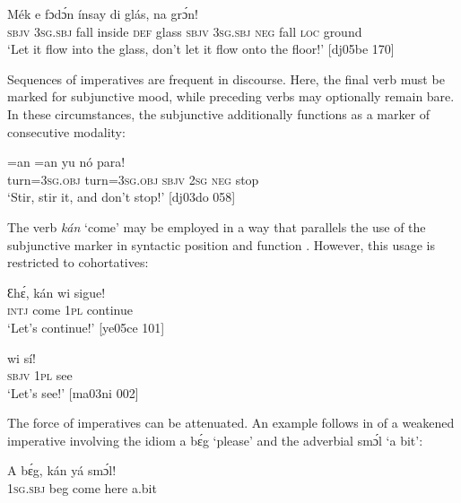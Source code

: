 \ea%
    \label{ex:key:435}
    \gll Mék    e    fɔdɔ́n  ínsay  di  glás,     
   na  grɔ́n!\\
\textsc{sbjv}    \textsc{3sg.sbj}  fall    inside  \textsc{def}  glass  \textsc{sbjv}    \textsc{3sg.sbj}
\textsc{neg}  fall    \textsc{loc}  ground\\

\glt ‘Let it flow into the glass, don’t let it flow onto the floor!’ [dj05be 170]
\z

Sequences of imperatives are frequent in discourse. Here, the final verb must be marked for subjunctive mood, while preceding verbs may optionally remain bare. In these circumstances, the subjunctive additionally functions as a marker of consecutive modality: 


\ea%
    \label{ex:key:436}
    \gll {}=an    =an     yu  nó  para!\\
turn=\textsc{3sg.obj}  turn=\textsc{3sg.obj}  \textsc{sbjv}    \textsc{2sg}  \textsc{neg}  stop\\

\glt ‘Stir, stir it, and don’t stop!’ [dj03do 058]
\z

The verb \textit{kán} ‘come’  may be employed in a way that parallels the use of the subjunctive marker in syntactic position and function . However, this usage is restricted to cohortatives:


\ea%
    \label{ex:key:437}
    \gll Ɛhɛ́,    kán    wi  sigue!\\
\textsc{intj}    come  \textsc{1pl}  continue\\

\glt ‘Let’s continue!’ [ye05ce 101] 
\z


\ea%
    \label{ex:key:438}
    \gll {} wi  sí!\\
\textsc{sbjv}    \textsc{1pl}  see\\

\glt ‘Let’s see!’ [ma03ni 002]
\z

The force of imperatives can be attenuated. An example follows in  of a weakened imperative involving the idiom a bɛ́g ‘please’ and the adverbial smɔ́l ‘a bit’:


\ea%
    \label{ex:key:439}
    \gll A    bɛ́g, kán    yá    smɔ́l!\\
\textsc{1sg.sbj}  beg  come  here    a.bit\\

